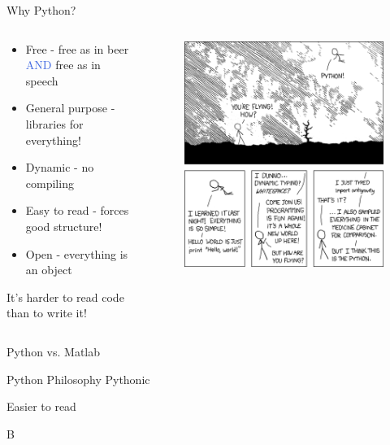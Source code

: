\documentclass[11pt,professionalfonts,aspectratio=169,final]{beamer}
\def\Emph{\textcolor{RoyalBlue}}
\begin{document}
\begin{frame}{Why Python?}
    \begin{columns}
    \begin{column}{0.5\textwidth}
    \begin{itemize}
        \item Free - free as in beer \Emph{AND} free as in speech
        \item General purpose - libraries for everything!
        \item Dynamic - no compiling
        \item Easy to read - forces good structure!
        \item Open - everything is an object
    \end{itemize}
    \begin{block}{}
        It's harder to read code than to write it!
    \end{block}
    \end{column}
    \begin{column}{0.5\textwidth}
        \begin{figure}
            \centering
            \includegraphics[width=\columnwidth,height=0.8\textheight,keepaspectratio]{figures/python.png}
        \end{figure}
    \end{column}
    \end{columns}
\end{frame}

\begin{frame}{Python vs. Matlab}

\end{frame}

\begin{frame}{Python Philosophy}
Pythonic

Easier to read

B
\end{frame}
\end{document}

